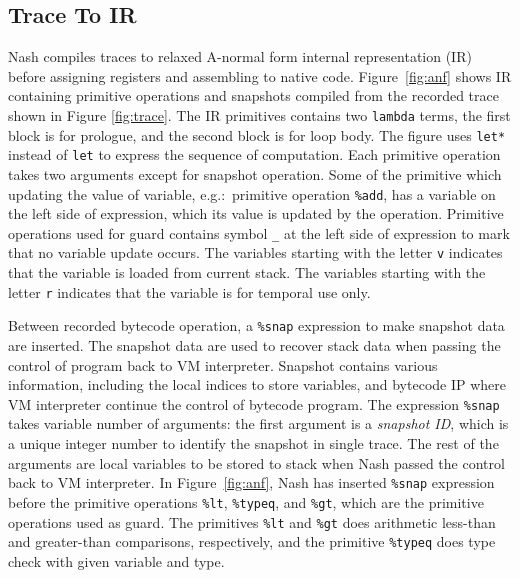 \documentclass[preprint, numbers]{sigplanconf}
\begin{document}
\subsection{Trace To IR}
Nash compiles traces to relaxed A-normal form\cite{flanagan1993essence}
internal representation (IR) before assigning registers and assembling to
native code. Figure~\hyperref[fig:anf]{\ref{fig:anf}} shows IR containing
primitive operations and snapshots compiled from the recorded trace shown in
Figure \hyperref[fig:trace]{\ref{fig:trace}}. The IR primitives contains two
\texttt{lambda} terms, the first block is for prologue, and the second block
is for loop body. The figure uses \texttt{let*} instead of \texttt{let} to
express the sequence of computation. Each primitive operation takes two
arguments except for snapshot operation. Some of the primitive which updating
the value of variable, e.g.:\ primitive operation \texttt{\%add}, has a
variable on the left side of expression, which its value is updated by the
operation. Primitive operations used for guard contains symbol \texttt{\_} at
the left side of expression to mark that no variable update occurs. The
variables starting with the letter \texttt{v} indicates that the variable is
loaded from current stack. The variables starting with the letter \texttt{r}
indicates that the variable is for temporal use only.

Between recorded bytecode operation, a \texttt{\%snap} expression to make
snapshot data are inserted. The snapshot data are used to recover stack data
when passing the control of program back to VM interpreter. Snapshot contains
various information, including the local indices to store variables, and
bytecode IP where VM interpreter continue the control of bytecode program. The
expression \texttt{\%snap} takes variable number of arguments: the first
argument is a \textit{snapshot ID}, which is a unique integer number to
identify the snapshot in single trace. The rest of the arguments are local
variables to be stored to stack when Nash passed the control back to VM
interpreter. In Figure~\hyperref[fig:anf]{\ref{fig:anf}}, Nash has inserted
\texttt{\%snap} expression before the primitive operations \texttt{\%lt},
\texttt{\%typeq}, and \texttt{\%gt}, which are the primitive operations used
as guard. The primitives \texttt{\%lt} and \texttt{\%gt} does arithmetic
less-than and greater-than comparisons, respectively, and the primitive
\texttt{\%typeq} does type check with given variable and type.
\end{document}
